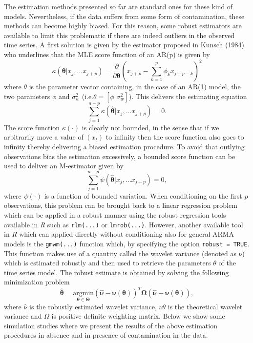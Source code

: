 \documentclass[]{book}
\theoremstyle{definition}
\theoremstyle{definition}
\theoremstyle{definition}
\theoremstyle{remark}
\begin{document}
{The estimation methods presented so far are standard ones for these kind
of models. Nevertheless, if the data suffers from some form of
contamination, these methods can become highly biased. For this reason,
some robust estimators are available to limit this problematic if there
are indeed outliers in the observed time series. A first solution is
given by the estimator proposed in Kunsch (1984) who underlines that the
MLE score function of an AR(p) is given by \begin{equation*}
 \kappa(\mathbf{\theta}|x_j,...x_{j+p}) = \frac{\partial}{\partial \mathbf{\theta}} (x_{j+p} - \sum_{k=1}^p \phi_k x_{j+p-k})^2
\end{equation*} where \(\theta\) is the parameter vector containing, in
the case of an AR(1) model, the two parameters \(\phi\) and
\(\sigma_w^2\) (i.e.\(\theta = [\phi \,\, \sigma_w^2]\)). This delivers
the estimating equation \begin{equation*}
\sum_{j=1}^{n-p} \kappa (\hat{\mathbf{\theta}}|x_j,...x_{j+p}) = 0 .
\end{equation*} The score function \(\kappa(\cdot)\) is clearly not
bounded, in the sense that if we arbitrarily move a value of \((x_t)\)
to infinity then the score function also goes to infinity thereby
delivering a biased estimation procedure. To avoid that outlying
observations bias the estimation excessively, a bounded score function
can be used to deliver an M-estimator given by \begin{equation*}
\sum_{j=1}^{n-p} \psi (\hat{\mathbf{\theta}}|x_j,...x_{j+p}) = 0,
\end{equation*} where \(\psi(\cdot)\) is a function of bounded
variation. When conditioning on the first \(p\) observations, this
problem can be brought back to a linear regression problem which can be
applied in a robust manner using the robust regression tools available
in \emph{R} such as \texttt{rlm(...)} or \texttt{lmrob(...)}. However,
another available tool in \emph{R} which can applied directly without
conditioning also for general ARMA models is the \texttt{gmwm(...)}
function which, by specifying the option \texttt{robust\ =\ TRUE}. This
function makes use of a quantity called the wavelet variance (denoted as
\(\nu\)) which is estimated robustly and then used to retrieve the
parameters \(\theta\) of the time series model. The robust estimate is
obtained by solving the following minimization problem \begin{equation*}
\hat{\boldsymbol{\theta}} = \underset{\boldsymbol{\theta} \in \boldsymbol{\Theta}}{\text{argmin}} (\hat{\boldsymbol{\nu}} - \boldsymbol{\nu}(\boldsymbol{\theta}))^T\boldsymbol{\Omega}(\hat{\boldsymbol{\nu}} - \boldsymbol{\nu}({\boldsymbol{\theta}})),
\end{equation*} where \(\hat{\nu}\) is the robustly estimated wavelet
variance, \(\nu{\theta}\) is the theoretical wavelet variance and
\(\Omega\) is positive definite weighting matrix. Below we show some
simulation studies where we present the results of the above estimation
procedures in absence and in presence of contamination in the data.

}
\end{document}
